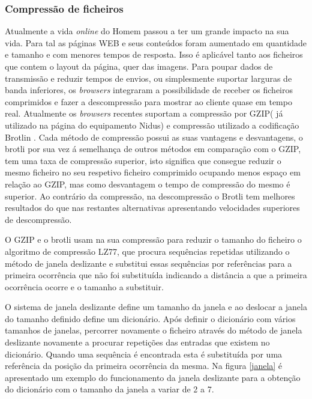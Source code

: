 \subsubsection{Compressão de ficheiros} 
\par
Atualmente a vida \textit{online} do Homem passou a ter um grande impacto na sua vida. Para tal as páginas WEB e seus conteúdos foram aumentado em quantidade e tamanho e com menores tempos de resposta. Isso é aplicável tanto aos ficheiros que contem o layout da página, quer das imagens. Para poupar dados de transmissão e reduzir tempos de envios, ou simplesmente suportar larguras de banda inferiores, os \textit{browsers} integraram a possibilidade de receber os ficheiros comprimidos e fazer a descompressão para mostrar ao cliente quase em tempo real. Atualmente os \textit{browsers} recentes suportam a compressão por GZIP( já utilizado na página do equipamento Nidus) e compressão utilizado a codificação Brotlin \cite{Alakuijala2019} \cite{brotlirfc}.
Cada método de compressão possui as suas vantagens e desvantagens, o brotli por sua vez á semelhança de outros métodos em comparação com o GZIP, tem uma taxa de compressão superior\cite{Alakuijala2015}, isto significa que consegue reduzir o mesmo ficheiro no seu respetivo ficheiro comprimido ocupando menos espaço em relação ao GZIP, mas como desvantagem o tempo de compressão do mesmo é superior. Ao contrário da compressão, na descompressão o Brotli tem melhores resultados do que nas restantes alternativas apresentando velocidades superiores de descompressão.
\par
O GZIP e o brotli usam na sua compressão para reduzir o tamanho do ficheiro o algoritmo de compressão LZ77, que procura sequências repetidas utilizando o método de janela deslizante e substitui essas sequências por referências para a primeira ocorrência que não foi substituída indicando a distância a que a primeira ocorrência ocorre e o tamanho a substituir.
\par O sistema de janela deslizante define um tamanho da janela e ao deslocar a janela do tamanho definido define um dicionário. Após definir o dicionário com vários tamanhos de janelas, percorrer novamente o ficheiro através do método de janela deslizante novamente a procurar repetições das entradas que existem no dicionário. Quando uma sequência é encontrada esta é substituída por uma referência da posição da primeira ocorrência da mesma. Na figura \ref{janela} é apresentado um exemplo do funcionamento da janela deslizante para a obtenção do dicionário com o tamanho da janela a variar de 2 a 7.
